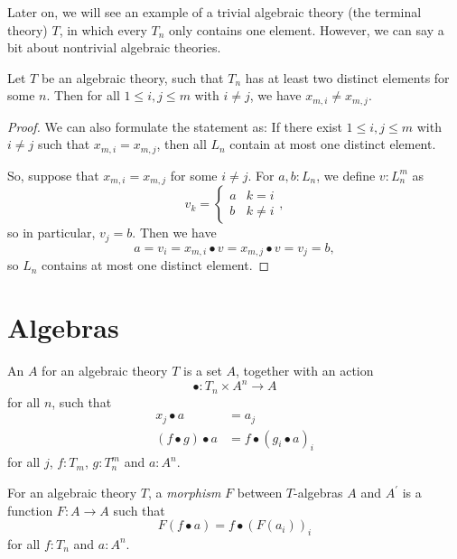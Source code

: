 Later on, we will see an example of a trivial algebraic theory (the terminal theory) $ T $, in which every $ T_n $ only contains one element. However, we can say a bit about nontrivial algebraic theories.
\begin{lemma}\label{lem:nontrivial-algebraic-theory}
  Let $ T $ be an algebraic theory, such that $ T_n $ has at least two distinct elements for some $ n $. Then for all $ 1 \leq i, j \leq m $ with $ i \not = j $, we have $ x_{m, i} \not = x_{m, j} $.
\end{lemma}
\begin{proof}
  We can also formulate the statement as: If there exist $ 1 \leq i, j \leq m $ with $ i \not = j $ such that $ x_{m, i} = x_{m, j} $, then all $ L_n $ contain at most one distinct element.

  So, suppose that $ x_{m, i} = x_{m, j} $ for some $ i \not = j $. For $ a, b : L_n $, we define $ v : L_n^m $ as
  \[ v_k = \left\{\begin{array}{ll} a & k = i\\ b & k \not = i \end{array}\right., \]
  so in particular, $ v_j = b $. Then we have
  \[ a = v_i = x_{m, i} \bullet v = x_{m, j} \bullet v = v_j = b, \]
  so $ L_n $ contains at most one distinct element.
\end{proof}

\section{Algebras}

\begin{definition}
  An  $ A $ for an algebraic theory $ T $ is a set $ A $, together with an action
  \[ \bullet: T_n \times A^n \to A \]
  for all $ n $, such that
  \begin{align*}
    x_j \bullet a &= a_j\\
    (f \bullet g) \bullet a &= f \bullet (g_i \bullet a)_i
  \end{align*}
  for all $ j $, $ f: T_m $, $ g: T_n^m $ and $ a: A^n $.
\end{definition}

\begin{definition}
  For an algebraic theory $ T $, a \textit{morphism} $ F $ between $ T $-algebras $ A $ and $ A^\prime $ is a function $ F: A \to A $ such that
  \[ F(f \bullet a) = f \bullet (F(a_i))_i \]
  for all $ f: T_n $ and $ a: A^n $.
\end{definition}

